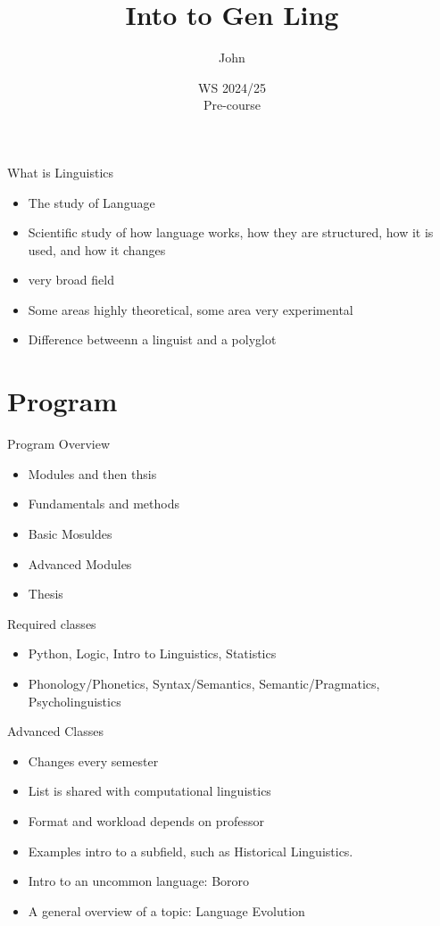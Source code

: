 \documentclass[aspectratio=169,hyperref={unicode}]{beamer}
\title{Into to Gen Ling}
\author{John}
\institute{Fachschaft General \& Computational Linguistics\\ \textbf{University of Tübingen}}
\date{WS 2024/25 \\ Pre-course}
\begin{document}
\frame{\titlepage}


\begin{frame}{What is Linguistics}
  \begin{itemize}
\item The study of Language
          \item Scientific study of how language works, how they are structured, how it is used, and how it changes
    \item very broad field
          \item Some areas highly theoretical, some area very experimental
          \item Difference betweenn a linguist and a polyglot
  \end{itemize}
\end{frame}

\section{Program}

\begin{frame}{Program Overview}
  \begin{itemize}
    \item Modules and then thsis
    \item Fundamentals and methods
    \item Basic Mosuldes
    \item Advanced Modules
          \item Thesis
  \end{itemize}

\end{frame}

\begin{frame}{Required classes}
\begin{itemize}
  \item Python, Logic, Intro to Linguistics, Statistics
        \item Phonology/Phonetics, Syntax/Semantics, Semantic/Pragmatics, Psycholinguistics
\end{itemize}

\end{frame}
\begin{frame}{Advanced Classes}
  \begin{itemize}
  \item Changes every semester
  \item List is shared with computational linguistics
  \item Format and workload depends on professor
  \item Examples intro to a subfield, such as Historical Linguistics.
  \item Intro to an uncommon language: Bororo
  \item A general overview of a topic: Language Evolution
  \end{itemize}
\end{frame}
\end{document}
